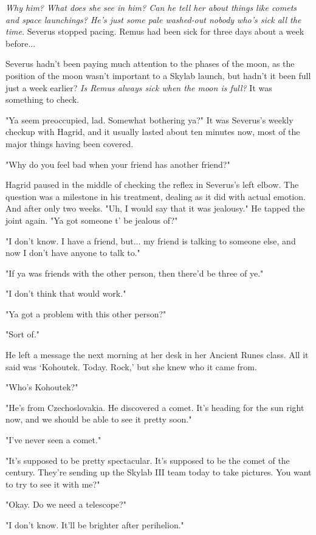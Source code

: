 \documentclass[a4paper,11pt]{article}
\begin{document}
\emph{Why him? What does she see in him? Can he tell her about things like comets and space launchings? He's just some pale washed-out nobody who's sick all the time.} Severus stopped pacing. Remus had been sick for three days about a week before...

Severus hadn't been paying much attention to the phases of the moon, as the position of the moon wasn't important to a Skylab launch, but hadn't it been full just a week earlier? \emph{Is Remus always sick when the moon is full?} It was something to check.

"Ya seem preoccupied, lad. Somewhat bothering ya?" It was Severus's weekly checkup with Hagrid, and it usually lasted about ten minutes now, most of the major things having been covered.

"Why do you feel bad when your friend has another friend?"

Hagrid paused in the middle of checking the reflex in Severus's left elbow. The question was a milestone in his treatment, dealing as it did with actual emotion. And after only two weeks. "Uh, I would say that it was jealousy." He tapped the joint again. "Ya got someone t' be jealous of?"

"I don't know. I have a friend, but... my friend is talking to someone else, and now I don't have anyone to talk to."

"If ya was friends with the other person, then there'd be three of ye."

"I don't think that would work."

"Ya got a problem with this other person?"

"Sort of."

He left a message the next morning at her desk in her Ancient Runes class. All it said was `Kohoutek. Today. Rock,' but she knew who it came from.

"Who's Kohoutek?"

"He's from Czechoslovakia. He discovered a comet. It's heading for the sun right now, and we should be able to see it pretty soon."

"I've never seen a comet."

"It's supposed to be pretty spectacular. It's supposed to be the comet of the century. They're sending up the Skylab III team today to take pictures. You want to try to see it with me?"

"Okay. Do we need a telescope?"

"I don't know. It'll be brighter after perihelion."
\end{document}

